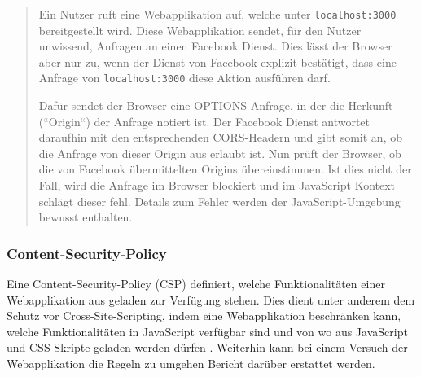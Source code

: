 \begin{quotation}
Ein Nutzer ruft eine Webapplikation auf, welche unter \texttt{localhost:3000} bereitgestellt wird. Diese Webapplikation sendet, für den Nutzer unwissend, Anfragen an einen Facebook Dienst. Dies lässt der Browser aber nur zu, wenn der Dienst von Facebook explizit bestätigt, dass eine Anfrage von \texttt{localhost:3000} diese Aktion ausführen darf.

Dafür sendet der Browser eine OPTIONS-Anfrage, in der die Herkunft (``Origin``) der Anfrage notiert ist. Der Facebook Dienst antwortet daraufhin mit den entsprechenden CORS-Headern und gibt somit an, ob die Anfrage von dieser Origin aus erlaubt ist. Nun prüft der Browser, ob die von Facebook übermittelten Origins übereinstimmen. Ist dies nicht der Fall, wird die Anfrage im Browser blockiert und im JavaScript Kontext schlägt dieser fehl. Details zum Fehler werden der JavaScript-Umgebung bewusst enthalten.
\end{quotation}

\subsubsection{Content-Security-Policy}


Eine Content-Security-Policy (CSP) definiert, welche Funktionalitäten einer Webapplikation aus geladen zur Verfügung stehen. Dies dient unter anderem dem Schutz vor Cross-Site-Scripting, indem eine Webapplikation beschränken kann, welche Funktionalitäten in JavaScript verfügbar sind und von wo aus JavaScript und CSS Skripte geladen werden dürfen \cite{MDNContentSecurityPolicy}. Weiterhin kann bei einem Versuch der Webapplikation die Regeln zu umgehen Bericht darüber erstattet werden.


